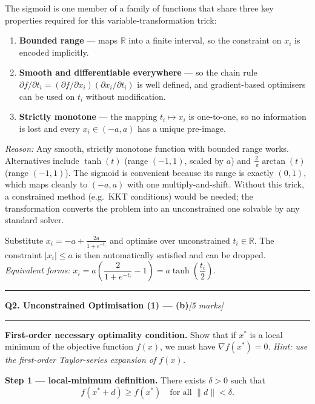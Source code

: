 \documentclass[10pt,a4paper]{article}
\newcommand{\sectitle}[2]{%
  \vspace{10pt}\noindent\rule{\linewidth}{0.8pt}\par\vspace{2pt}%
  {\large\textbf{#1}\hfill\normalsize\textit{[#2 marks]}}\par
  \vspace{2pt}\rule{\linewidth}{0.4pt}\vspace{4pt}}
\newcommand{\reason}[1]{%
  \begin{mdframed}[backgroundcolor=reasonbg, linewidth=0.4pt,
    innertopmargin=3pt, innerbottommargin=3pt,
    innerleftmargin=6pt, innerrightmargin=6pt]
    \small\textit{Reason:} \small #1
  \end{mdframed}\vspace{2pt}}
\newenvironment{resultbox}{%
  \begin{mdframed}[backgroundcolor=boxbg, linewidth=0.6pt,
    innertopmargin=5pt, innerbottommargin=5pt,
    innerleftmargin=8pt, innerrightmargin=8pt]
}{\end{mdframed}}
\begin{document}
The sigmoid is one member of a family of functions that share three key properties
required for this variable-transformation trick:
\begin{enumerate}
  \item \textbf{Bounded range} --- maps $\mathbb{R}$ into a finite interval,
        so the constraint on $x_i$ is encoded implicitly.
  \item \textbf{Smooth and differentiable everywhere} --- so the chain rule
        $\partial f/\partial t_i = (\partial f/\partial x_i)(\partial x_i/\partial t_i)$
        is well defined, and gradient-based optimisers can be used on $t_i$
        without modification.
  \item \textbf{Strictly monotone} --- the mapping $t_i\mapsto x_i$ is one-to-one,
        so no information is lost and every $x_i\in(-a,a)$ has a unique pre-image.
\end{enumerate}

\reason{Any smooth, strictly monotone function with bounded range works.
        Alternatives include $\tanh(t)$ (range $(-1,1)$, scaled by $a$) and
        $\tfrac{2}{\ \pi}\arctan(t)$ (range $(-1,1)$).
        The sigmoid is convenient because its range is exactly $(0,1)$,
        which maps cleanly to $(-a,a)$ with one multiply-and-shift.
        Without this trick, a constrained method (e.g.\ KKT conditions)
        would be needed; the transformation converts the problem into
        an unconstrained one solvable by any standard solver.}

\begin{resultbox}
Substitute $\displaystyle x_i = -a + \frac{2a}{1+e^{-t_i}}$
and optimise over unconstrained $t_i\in\mathbb{R}$.
The constraint $|x_i|\le a$ is then automatically satisfied and can be dropped.
\smallskip\\
\textit{Equivalent forms:}\;
$x_i = a\!\left(\dfrac{2}{1+e^{-t_i}}-1\right) = a\tanh\!\left(\dfrac{t_i}{2}\right)$.
\end{resultbox}

\newpage
\sectitle{Q2. Unconstrained Optimisation (1) --- (b)}{5}

\noindent\textbf{First-order necessary optimality condition.} Show that if
$x^*$ is a local minimum of the objective function $f(x)$, we must have
$\nabla f(x^*)=0$.
\textit{Hint: use the first-order Taylor-series expansion of $f(x)$.}

\vspace{6pt}
\textbf{Step 1 --- local-minimum definition.}
There exists $\delta>0$ such that
\[
  f(x^*+d)\ge f(x^*)\quad\text{for all }\|d\|<\delta.
\]
\end{document}
